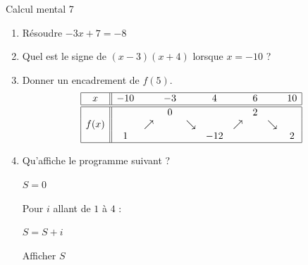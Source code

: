 \documentclass{beamer}
\newenvironment{fmpage}[1]
 {\begin{lrbox}{\fmbox}\begin{minipage}{#1}}
     {\end{minipage}\end{lrbox}
     \fbox{\usebox{\fmbox}}
 }
\begin{document}
\begin{frame}{Calcul mental 7}
    \begin{enumerate}
            \pause
        \item
            Résoudre \( -3x+7=-8\)
        \item
            \pause
            Quel est le signe de \( (x-3)(x+4)\) lorsque \( x=-10\) ?
        \item
            \pause
            Donner un encadrement de \( f(5)\).
    \begin{equation*}
        \begin{array}[]{|c||ccccccccc|}
            \hline
            x&-10&&-3&&4&&6&&10\\
            \hline\hline
            &&&0&&&&2&&\\
            f(x)&&\nearrow&&\searrow&&\nearrow&&\searrow&\\
            &1&&&&-12&&&&2\\
            \hline
        \end{array}
    \end{equation*}
        \item
            \pause
                Qu'affiche le programme suivant ?
\begin{fmpage}{0.9\linewidth}

    $S = 0$

    Pour \( i\) allant de \( 1\) à \( 4\) :

    \hspace{1cm} \( S=S+i\)

    Afficher \( S\)

\end{fmpage}
    \end{enumerate}
\end{frame}
\end{document}

